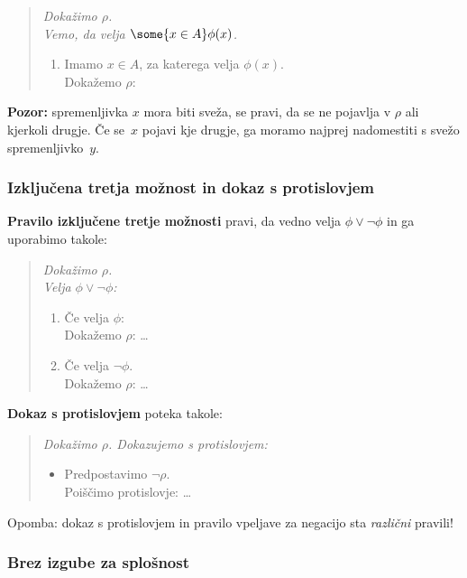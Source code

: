 \begin{quote}
  \sl
  Dokažimo $\rho$.\\
  Vemo, da velja $\some{x \in A} \phi(x)$.
  \begin{enumerate}
  \item[] Imamo $x \in A$, za katerega velja $\phi(x)$.\\
       Dokažemo $\rho$: \quad {}
  \end{enumerate}
\end{quote}
%
\textbf{Pozor:} spremenljivka $x$ mora biti sveža, se pravi, da se ne pojavlja v $\rho$ ali kjerkoli drugje. Če se~$x$ pojavi kje drugje, ga moramo najprej nadomestiti s svežo spremenljivko~$y$.

\subsubsection{Izključena tretja možnost in dokaz s protislovjem}

\textbf{Pravilo izključene tretje možnosti} pravi, da vedno velja $\phi \lor \lnot\phi$ in ga uporabimo takole:
%
\begin{quote}
  \sl
  Dokažimo $\rho$.\\
  Velja $\phi \lor \lnot \phi$:
  \begin{enumerate}
  \item Če velja $\phi$:\\
        Dokažemo $\rho$: \quad \dots
  \item Če velja $\lnot\phi$. \\
        Dokažemo $\rho$: \quad \dots
  \end{enumerate}
\end{quote}
%
\textbf{Dokaz s protislovjem} poteka takole:
%
\begin{quote}
  \sl
  Dokažimo $\rho$. Dokazujemo s protislovjem:
  \begin{itemize}
  \item[] Predpostavimo $\lnot\rho$.\\
        Poiščimo protislovje: \quad \dots
  \end{itemize}
\end{quote}
%
Opomba: dokaz s protislovjem in pravilo vpeljave za negacijo sta \emph{različni}
pravili!

\subsubsection{Brez izgube za splošnost}

